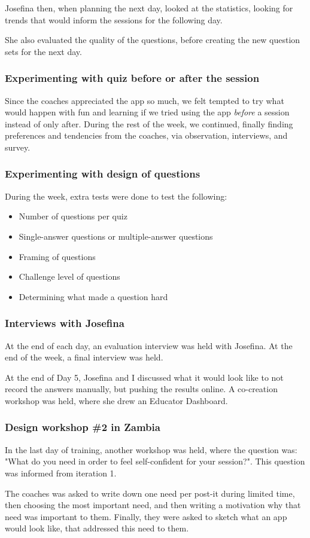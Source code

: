 Josefina then, when planning the next day, looked at the statistics, looking for trends that would inform the sessions for the following day.

She also evaluated the quality of the questions, before creating the new question sets for the next day.

\subsubsection{Experimenting with quiz before or after the session}
Since the coaches appreciated the app so much, we felt tempted to try what would happen with fun and learning if we tried using the app \textit{before} a session instead of only after. During the rest of the week, we continued, finally finding preferences and tendencies from the coaches, via observation, interviews, and survey.

\subsubsection{Experimenting with design of questions}
During the week, extra tests were done to test the following:

\begin{itemize}
\item Number of questions per quiz
\item Single-answer questions or multiple-answer questions
\item Framing of questions
\item Challenge level of questions
\item Determining what made a question hard
\end{itemize}

\subsubsection{Interviews with Josefina}
At the end of each day, an evaluation interview was held with Josefina. At the end of the week, a final interview was held.

At the end of Day 5, Josefina and I discussed what it would look like to not record the answers manually, but pushing the results online. A co-creation workshop was held, where she drew an Educator Dashboard.

\subsubsection{Design workshop \#2 in Zambia}
In the last day of training, another workshop was held, where the question was: "What do you need in order to feel self-confident for your session?". This question was informed from iteration 1.

The coaches was asked to write down one need per post-it during limited time, then choosing the most important need, and then writing a motivation why that need was important to them. Finally, they were asked to sketch what an app would look like, that addressed this need to them.
